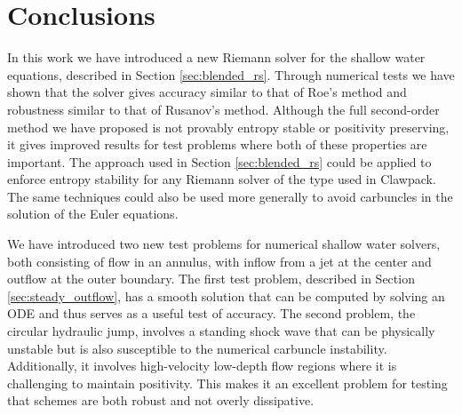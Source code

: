 \documentclass[preprint, 11pt]{article}
\begin{document}




\section{Conclusions}\label{sec:conclusion}
In this work we have introduced a new Riemann solver for the shallow water
equations, described in Section \ref{sec:blended_rs}.  Through numerical tests we have
shown that the solver gives accuracy similar to that of Roe's method and
robustness similar to that of Rusanov's method.  Although the full
second-order method we have proposed is not provably entropy stable or
positivity preserving, it gives improved results for test problems
where both of these properties are important.  The approach used in Section
\ref{sec:blended_rs} could be applied to enforce entropy stability for any Riemann
solver of the type used in Clawpack.  The same techniques could also
be used more generally to avoid carbuncles in the solution of the
Euler equations.

We have introduced two new test problems for numerical shallow water solvers,
both consisting of flow in an annulus, with inflow from a jet
at the center and outflow at the outer boundary.  The first test
problem, described in Section \ref{sec:steady_outflow}, has a smooth solution that can
be computed by solving an ODE and thus serves as a useful test of
accuracy.  The second problem, the circular hydraulic jump, involves
a standing shock wave that can be physically unstable but is
also susceptible to the numerical carbuncle instability.
Additionally, it involves high-velocity low-depth flow regions where
it is challenging to maintain positivity.
This makes it an excellent problem for testing that schemes are both
robust and not overly dissipative.

%


\end{document}
